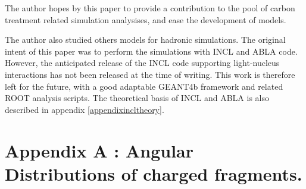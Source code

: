 The author hopes by this paper to provide a contribution to the pool of carbon treatment related simulation analysises, and ease the development of models.

The author also studied others models for hadronic simulations. The original intent of this paper was to perform the simulations with INCL and ABLA code. However, the anticipated release of the INCL code supporting light-nucleus interactions has not been released at the time of writing. This work is therefore left for the future, with a good adaptable GEANT4b framework and related ROOT analysis scripts. The theoretical basis of INCL and ABLA is also described in appendix \ref{appendixincltheory}.


  

\appendix 

\clearpage
{}
\section*{Appendix A \label{AppendixA}: Angular Distributions of charged fragments.\label{AngularDistributionAppendix}}

\renewcommand{\theequation}{A\arabic{equation}}
\setcounter{equation}{0}  
\renewcommand{\thefigure}{A\arabic{figure}}
\setcounter{figure}{0}
\renewcommand{\thetable}{A\arabic{table}}
\setcounter{table}{0}
\renewcommand\thesection{A}
\setcounter{section}{1}


